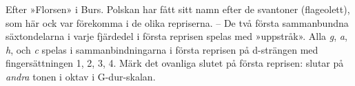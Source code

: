 Efter »Florsen» i Burs. Polskan har fått sitt namn efter de svantoner (flageolett),
som här ock var förekomma i de olika repriserna. -- De två första
sammanbundna säxtondelarna i varje fjärdedel i första reprisen
spelas med »uppstråk». Alla \textit{g}, \textit{a}, \textit{h}, och \textit{c} spelas i sammanbindningarna
i första reprisen på d-strängen med fingersättningen 1, 2, 3, 4.
Märk det ovanliga slutet på första reprisen: slutar på \textit{andra}
tonen i oktav i G-dur-skalan.
